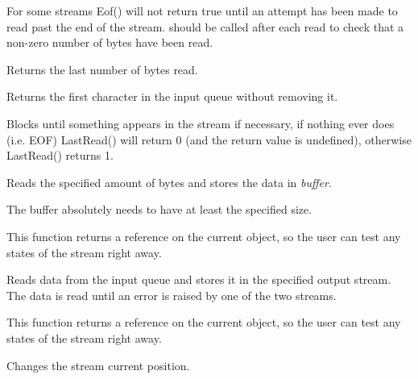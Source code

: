 For some streams Eof() will not return true until an
attempt has been made to read past the end of the stream.
should be called after each read to check that
a non-zero number of bytes have been read.

\label{wxinputstreamlastread}


Returns the last number of bytes read.

\label{wxinputstreampeek}


Returns the first character in the input queue without removing it.


Blocks until something appears in the stream if necessary, if nothing
ever does (i.e. EOF) LastRead() will return 0 (and the return value is
undefined), otherwise LastRead() returns 1.

\label{wxinputstreamread}


Reads the specified amount of bytes and stores the data in {\it buffer}.


The buffer absolutely needs to have at least the specified size.


This function returns a reference on the current object, so the user can test
any states of the stream right away.


Reads data from the input queue and stores it in the specified output stream.
The data is read until an error is raised by one of the two streams.


This function returns a reference on the current object, so the user can test
any states of the stream right away.

\label{wxinputstreamseeki}


Changes the stream current position.

